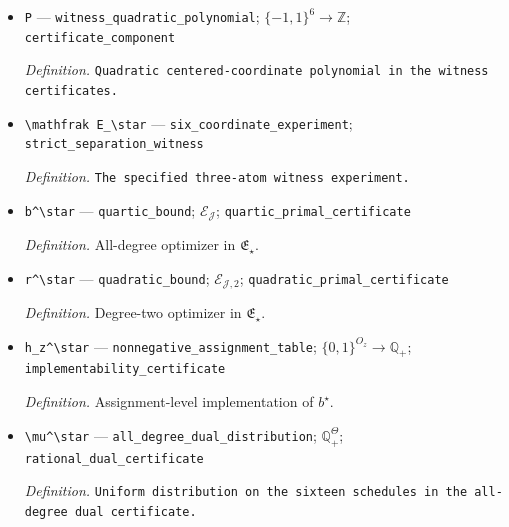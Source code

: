 \documentclass{article}
\begin{document}
\begin{itemize}
  \par\smallskip\noindent\emph{Definition.} Vector collecting the centered coordinates \(x_i\) in the witness.
  \item \texttt{P} --- \texttt{witness\_\allowbreak{}quadratic\_\allowbreak{}polynomial}; \(\{-1,1\}^6\to\mathbb Z\); \texttt{certificate\_\allowbreak{}component}
  \par\smallskip\noindent\emph{Definition.} \texttt{Quadratic centered-\allowbreak{}coordinate polynomial in the witness certificates.}
  \item \texttt{\textbackslash{}\allowbreak{}mathfrak E\_\allowbreak{}\textbackslash{}\allowbreak{}star} --- \texttt{six\_\allowbreak{}coordinate\_\allowbreak{}experiment}; \texttt{strict\_\allowbreak{}separation\_\allowbreak{}witness}
  \par\smallskip\noindent\emph{Definition.} \texttt{The specified three-\allowbreak{}atom witness experiment.}
  \item \texttt{b\textasciicircum{}\textbackslash{}\allowbreak{}star} --- \texttt{quartic\_\allowbreak{}bound}; \(\mathcal E_{\mathcal J}\); \texttt{quartic\_\allowbreak{}primal\_\allowbreak{}certificate}
  \par\smallskip\noindent\emph{Definition.} All-degree optimizer in \(\mathfrak E_\star\).
  \item \texttt{r\textasciicircum{}\textbackslash{}\allowbreak{}star} --- \texttt{quadratic\_\allowbreak{}bound}; \(\mathcal E_{\mathcal J,2}\); \texttt{quadratic\_\allowbreak{}primal\_\allowbreak{}certificate}
  \par\smallskip\noindent\emph{Definition.} Degree-two optimizer in \(\mathfrak E_\star\).
  \item \texttt{h\_\allowbreak{}z\textasciicircum{}\textbackslash{}\allowbreak{}star} --- \texttt{nonnegative\_\allowbreak{}assignment\_\allowbreak{}table}; \(\{0,1\}^{O_z}\to\mathbb Q_+\); \texttt{implementability\_\allowbreak{}certificate}
  \par\smallskip\noindent\emph{Definition.} Assignment-level implementation of \(b^\star\).
  \item \texttt{\textbackslash{}\allowbreak{}mu\textasciicircum{}\textbackslash{}\allowbreak{}star} --- \texttt{all\_\allowbreak{}degree\_\allowbreak{}dual\_\allowbreak{}distribution}; \(\mathbb Q_+^\Theta\); \texttt{rational\_\allowbreak{}dual\_\allowbreak{}certificate}
  \par\smallskip\noindent\emph{Definition.} \texttt{Uniform distribution on the sixteen schedules in the all-\allowbreak{}degree dual certificate.}

\end{itemize}
\end{document}
